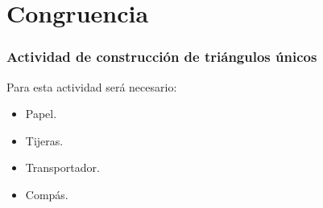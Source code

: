 \chapter{Congruencia}\label{seccioncongruncias}

\subsection*{Actividad de construcción de triángulos únicos}\label{sub.sec.construccion.de.triangulos.unicos}
Para esta actividad será necesario:

\begin{itemize}
	\item Papel.
	\item Tijeras.
	\item Transportador.
	\item Compás.
\end{itemize}

